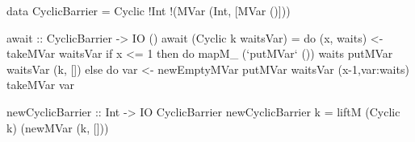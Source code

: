 data CyclicBarrier = Cyclic !Int !(MVar (Int, [MVar ()]))

await :: CyclicBarrier -> IO ()
await (Cyclic k waitsVar) = do
	(x, waits) <- takeMVar waitsVar
	if x <= 1 then do
		mapM_ (`putMVar` ()) waits
		putMVar waitsVar (k, [])
	  else do
	  	var <- newEmptyMVar
	  	putMVar waitsVar (x-1,var:waits)
	  	takeMVar var

newCyclicBarrier :: Int -> IO CyclicBarrier
newCyclicBarrier k = liftM (Cyclic k) (newMVar (k, []))
